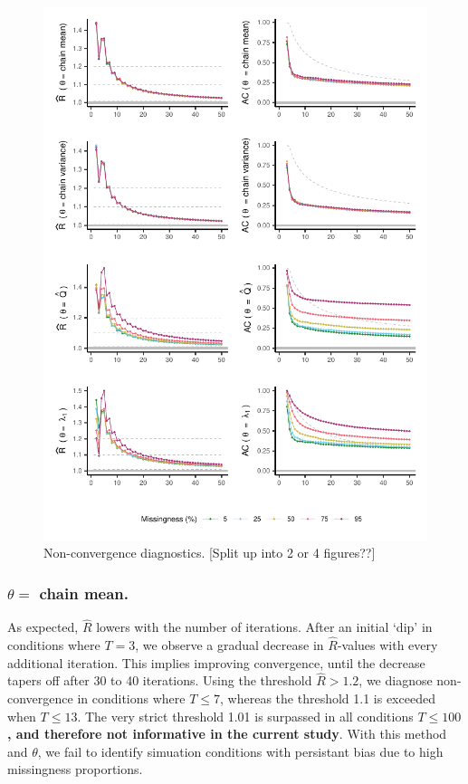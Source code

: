 \documentclass[Royal,times,sageh]{sagej}
\begin{document}
\begin{figure}

{\centering \includegraphics{2.Manuscript_files/figure-latex/rhats-acs-1} 

}

\caption{Non-convergence diagnostics. [Split up into 2 or 4 figures??]}\label{fig:rhats-acs}
\end{figure}

\hypertarget{theta-chain-mean.}{%
\subsubsection{\texorpdfstring{\(\theta=\) chain mean.}{\textbackslash theta= chain mean.}}\label{theta-chain-mean.}}

As expected, \(\widehat{R}\) lowers with the number of iterations. After an initial `dip' in conditions where \(T=3\), we observe a gradual decrease in \(\widehat{R}\)-values with every additional iteration. This implies improving convergence, until the decrease tapers off after 30 to 40 iterations. Using the threshold \(\widehat{R}>1.2\), we diagnose non-convergence in conditions where \(T\leq7\), whereas the threshold 1.1 is exceeded when \(T\leq13\). The very strict threshold 1.01 is surpassed in all conditions \(T\leq100\)\textbf{, and therefore not informative in the current study}. With this method and \(\theta\), we fail to identify simuation conditions with persistant bias due to high missingness proportions.
\end{document}
